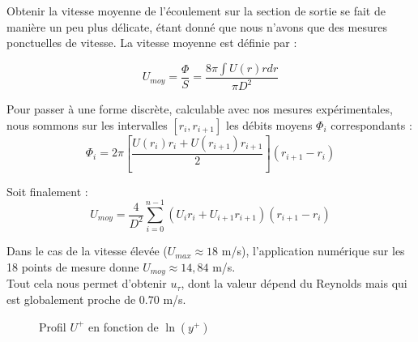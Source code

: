 \documentclass[12pt, a4paper]{report}
\begin{document}
	\noindent Obtenir la vitesse moyenne de l'écoulement sur la section de sortie se fait de manière un peu plus délicate, étant donné que nous n'avons que des mesures ponctuelles de vitesse. La vitesse moyenne est définie par :
	
	\begin{equation*}
		U_{moy} = \frac{\Phi}{S} = \frac{8 \pi \int U(r) r dr}{\pi D^2}
	\end{equation*}
	
	\noindent Pour passer à une forme discrète, calculable avec nos mesures expérimentales, nous sommons sur les intervalles $[r_i, r_{i+1}]$ les débits moyens $\Phi_i$ correspondants :
	\begin{equation*}
		\Phi_i =  2\pi \left[ \frac{U(r_i) r_i + U(r_{i+1}) r_{i+1}}{2} \right] (r_{i+1}-r_i)
	\end{equation*}
	
	\noindent Soit finalement :	
	\begin{equation*}
		U_{moy} =\frac{4}{D^2} \sum_{i=0}^{n-1} (U_i r_i + U_{i+1} r_{i+1}) (r_{i+1}-r_i)
	\end{equation*}
	
	\noindent Dans le cas de la vitesse élevée ($U_{max} \approx 18$ m/s), l'application numérique sur les 18 points de mesure donne $U_{moy} \approx 14,84 $ m/s.\\

	\noindent Tout cela nous permet d'obtenir $u_\tau$, dont la valeur dépend du Reynolds mais qui est globalement proche de $0.70$ m/s.
	
	\begin{figure}[ht]
		\centering
		\caption{Profil $U^+$ en fonction de $\ln(y^+)$}
		\label{profil_y+_U+}
	\end{figure}
	
\end{document}

